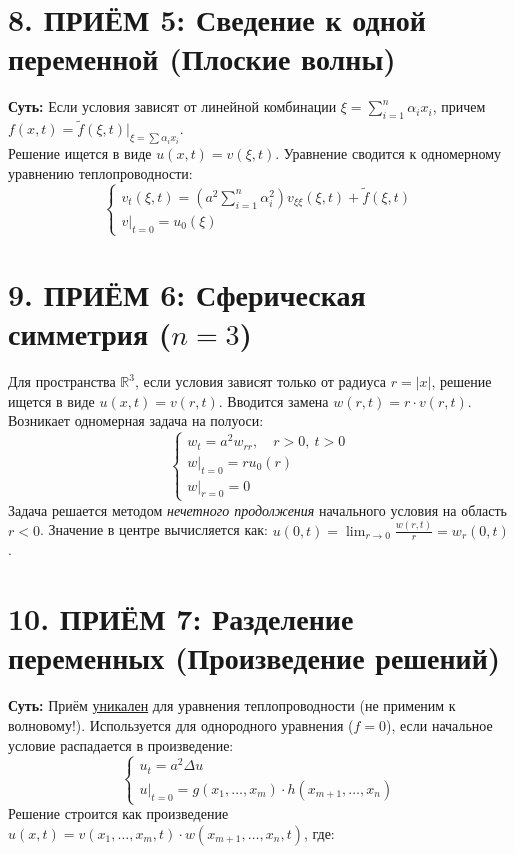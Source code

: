 \section{8. ПРИЁМ 5: Сведение к одной переменной (Плоские волны)}
\textbf{Суть:} Если условия зависят от линейной комбинации $\xi = \sum_{i=1}^n \alpha_i x_i$, причем $f(x,t) = \tilde{f}(\xi, t)\big|_{\xi = \sum \alpha_i x_i}$. \\
Решение ищется в виде $u(x,t) = v(\xi, t)$. Уравнение сводится к одномерному уравнению теплопроводности:
\[ 
\begin{cases}
v_t(\xi,t) = \left( a^2 \sum\limits_{i=1}^n \alpha_i^2 \right) v_{\xi\xi}(\xi,t) + \tilde{f}(\xi, t) \\
v|_{t=0} = u_0(\xi)
\end{cases}
\]

\section{9. ПРИЁМ 6: Сферическая симметрия ($n=3$)}
Для пространства $\mathbb{R}^3$, если условия зависят только от радиуса $r = |x|$, решение ищется в виде $u(x,t) = v(r, t)$. Вводится замена \textbf{$w(r,t) = r \cdot v(r,t)$}. Возникает одномерная задача на полуоси:
\[ 
\begin{cases} 
w_t = a^2 w_{rr}, \quad r>0, \ t>0 \\ 
w|_{t=0} = r u_0(r) \\ 
w|_{r=0} = 0 
\end{cases} 
\]
Задача решается методом \textit{нечетного продолжения} начального условия на область $r < 0$. Значение в центре вычисляется как: $u(0,t) = \lim_{r \to 0} \frac{w(r,t)}{r} = w_r(0,t)$.

\section{10. ПРИЁМ 7: Разделение переменных (Произведение решений)}
\textbf{Суть:} Приём \underline{уникален} для уравнения теплопроводности (не применим к волновому!). Используется для однородного уравнения ($f=0$), если начальное условие распадается в произведение:
\[
\begin{cases}
u_t = a^2 \Delta u \\
u|_{t=0} = g(x_1, \dots, x_m) \cdot h(x_{m+1}, \dots, x_n)
\end{cases}
\]
Решение строится как произведение $u(x,t) = v(x_1, \dots, x_m, t) \cdot w(x_{m+1}, \dots, x_n, t)$, где:
\vspace{0.1cm}

